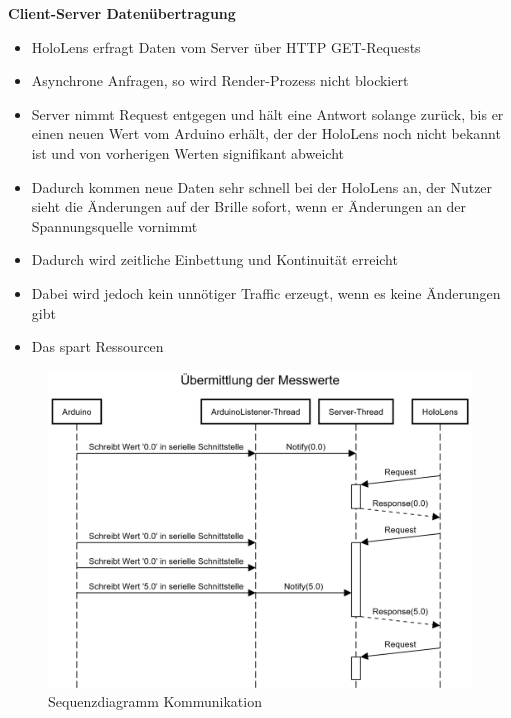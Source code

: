 \textbf{Client-Server Datenübertragung}
\begin{itemize}
	\item HoloLens erfragt Daten vom Server über HTTP GET-Requests
	\item Asynchrone Anfragen, so wird Render-Prozess nicht blockiert
	\item Server nimmt Request entgegen und hält eine Antwort solange zurück, bis er einen neuen Wert vom Arduino erhält, der der HoloLens noch nicht bekannt ist und von vorherigen Werten signifikant abweicht
	\item Dadurch kommen neue Daten sehr schnell bei der HoloLens an, der Nutzer sieht die Änderungen auf der Brille sofort, wenn er Änderungen an der Spannungsquelle vornimmt
	\item Dadurch wird zeitliche Einbettung und Kontinuität erreicht
	\item Dabei wird jedoch kein unnötiger Traffic erzeugt, wenn es keine Änderungen gibt
	\item Das spart Ressourcen
\end{itemize}
\begin{figure}[h!]
	\centering
	\includegraphics[width=1\textwidth]{images/Sequenzdiagramm.png}
	\caption{Sequenzdiagramm Kommunikation}
	\label{img:Sequenzdiagramm}
\end{figure}

